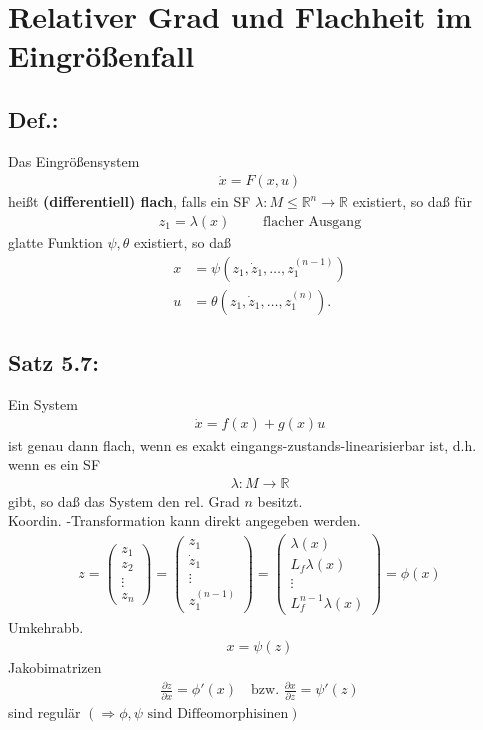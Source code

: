 \documentclass[ngerman]{tudscrreprt}
\begin{document}
\section{Relativer Grad und Flachheit im Eingrößenfall}
\subsection*{Def.:}Das Eingrößensystem \begin{align*}
\dot x = F(x,u)
\end{align*}heißt \textbf{(differentiell) flach}, falls ein SF $\lambda: M\le \mathbb{R}^n \to \mathbb{R}$ existiert, so daß für \begin{align*}
z_1 = \lambda(x) \qquad \text{ flacher Ausgang}
\end{align*}
glatte Funktion $\psi, \theta$ existiert, so daß \begin{align*}
x &= \psi(z_1, \dot z_1, \dots, z_1^{(n-1)})\\ 
u &= \theta(z_1, \dot z_1, \dots, z_1^{(n)}).
\end{align*}
\subsection*{Satz 5.7:}Ein System \begin{align*}
\dot x = f(x) + g(x)u \tag{5.1}
\end{align*}ist genau dann flach, wenn es exakt eingangs-zustands-linearisierbar ist, d.h. wenn es ein SF \begin{align*}\lambda: M\to \mathbb{R} \end{align*}gibt, so daß das System den rel. Grad $n$ besitzt.\\ 
Koordin. -Transformation kann direkt angegeben werden. \begin{align*}
z = \begin{pmatrix} z_1\\ z_2 \\ \vdots\\ z_n \end{pmatrix} = \begin{pmatrix} z_1\\ \dot z_1\\ \vdots\\ z_1^{(n-1)}\end{pmatrix} = \begin{pmatrix}\lambda(x)\\ L_f \lambda(x)\\ \vdots\\ L_f^{n-1}\lambda(x)\end{pmatrix} = \phi(x)
\end{align*}Umkehrabb. \begin{align*} x = \psi(z)\end{align*}Jakobimatrizen \begin{align*}\frac{\partial z}{\partial x} = \phi'(x) \quad \text{bzw. } \frac{\partial x}{\partial z} = \psi'(z) \end{align*} sind regulär $(\Rightarrow \phi, \psi \text{ sind Diffeomorphisinen})$
\end{document}
